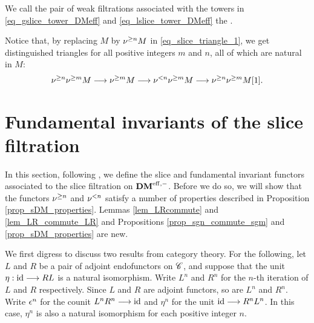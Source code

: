 We call the pair of weak filtrations associated with the
towers in \eqref{eq_gslice_tower_DMeff} and 
\eqref{eq_lslice_tower_DMeff} the .

Notice that, by replacing $M$ by $\nu^{\geq n} M$ in 
\eqref{eq_slice_triangle_1}, we get distinguished triangles for 
all positive integers $m$ and $n$, all of which are natural in 
$M$:
\begin{equation}\label{eq_slice_triangle_2}
\nu^{\geq n}\nu^{\geq m} M \longrightarrow \nu^{\geq m}M \longrightarrow \nu^{< n}\nu^{\geq m}M \longrightarrow 
   \nu^{\geq n}\nu^{\geq m} M[1].
\end{equation}

\section{Fundamental invariants of the slice filtration}

In this section, following \cite[1.4 (iv, v)]{HuKa}, we define
the slice and fundamental invariant functors associated to the
slice filtration on $\mathbf{DM}^{\mathrm{eff},-}$. Before we do so, we will show that 
the functors $\nu^{\geq n}$ and $\nu^{< n}$ satisfy a number of 
properties described in Proposition \ref{prop_sDM_properties}.
Lemmas \ref{lem_LRcommute} and \ref{lem_LR_commute_LR} and 
Propositions \ref{prop_sgn_commute_sgm} and 
\ref{prop_sDM_properties} are new.

We first digress to discuss two results from category theory.
For the following, let $L$ and $R$ be a pair of adjoint 
endofunctors on $\mathscr{C}$, and suppose that the unit $\eta : \mathrm{id} 
\longrightarrow RL$ is a natural isomorphism. Write $L^n$ and $R^n$ for the 
$n$-th iteration of $L$ and $R$ respectively. Since $L$ and $R$ 
are adjoint functors, so are $L^n$ and $R^n$. Write $\epsilon^n$ for 
the counit $L^n R^n \longrightarrow \mathrm{id}$ and $\eta^n$ for the unit $\mathrm{id} \longrightarrow 
R^n L^n$. In this case, $\eta^n$ is also a natural isomorphism for 
each positive integer $n$. 

